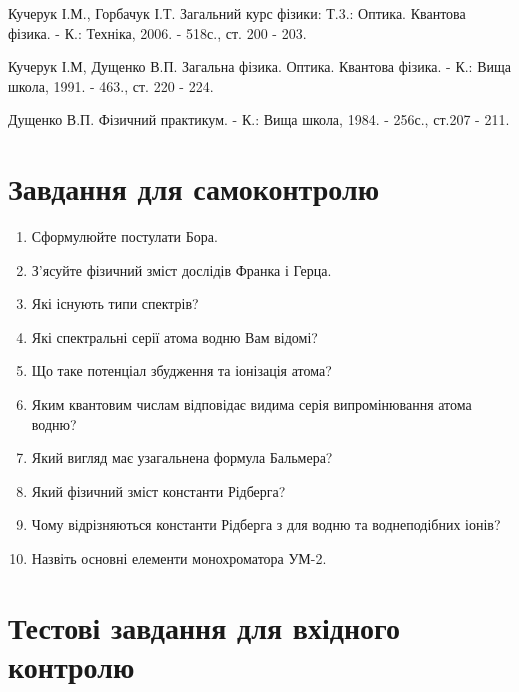 \documentclass[twocolumn]{el-author}
\begin{document}
\begin{thebibliography}{}

Кучерук І.М., Горбачук І.Т. Загальний курс фізики: Т.3.: Оптика.
Квантова фізика. - К.: Техніка, 2006. - 518с., ст. 200 - 203.

Кучерук І.М, Дущенко В.П. Загальна фізика. Оптика. Квантова
фізика. - К.: Вища школа, 1991. - 463., ст. 220 - 224.

Дущенко В.П. Фізичний практикум. - К.: Вища школа, 1984. -
256с., ст.207 - 211.

\end{thebibliography}

\section{Завдання для самоконтролю}

\begin{enumerate}
	\item Сформулюйте постулати Бора.
	\item З'ясуйте фізичний зміст дослідів Франка і Герца.
	\item Які існують типи спектрів?
	\item Які спектральні серії атома водню Вам відомі?
	\item Що таке потенціал збудження та іонізація атома?
	\item Яким квантовим числам відповідає видима серія випромінювання
атома водню?
	\item Який вигляд має узагальнена формула Бальмера?
	\item Який фізичний зміст константи Рідберга?
	\item Чому відрізняються константи Рідберга з для водню та
воднеподібних іонів?
	\item Назвіть основні елементи монохроматора УМ-2.
\end{enumerate}

\clearpage
\section{Тестові завдання для вхідного контролю}
\end{document}
